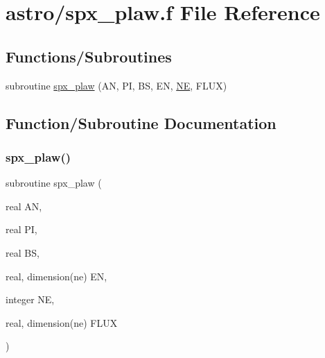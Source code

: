 \hypertarget{spx__plaw_8f}{}\section{astro/spx\+\_\+plaw.f File Reference}
\label{spx__plaw_8f}
\subsection*{Functions/\+Subroutines}
\begin{DoxyCompactItemize}
\item 
subroutine \hyperlink{spx__plaw_8f_ac39d82d351110b10f92b38f24d729766}{spx\+\_\+plaw} (AN, PI, BS, EN, \hyperlink{eval__tab_8h_a5af9139e882aef6c820ae908589a40d6}{NE}, F\+L\+UX)
\end{DoxyCompactItemize}


\subsection{Function/\+Subroutine Documentation}
\mbox{\label{spx__plaw_8f_ac39d82d351110b10f92b38f24d729766}} 
\subsubsection{\texorpdfstring{spx\+\_\+plaw()}{spx\_plaw()}}
{\footnotesize\ttfamily subroutine spx\+\_\+plaw (\begin{DoxyParamCaption}\item[{real}]{AN,  }\item[{real}]{PI,  }\item[{real}]{BS,  }\item[{real, dimension(ne)}]{EN,  }\item[{integer}]{NE,  }\item[{real, dimension(ne)}]{F\+L\+UX }\end{DoxyParamCaption})}

